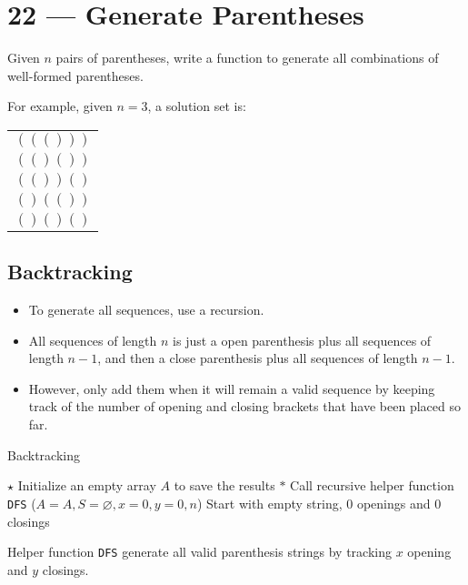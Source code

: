 \section{22 --- Generate Parentheses}
Given $ n $ pairs of parentheses, write a function to generate all combinations of well-formed parentheses.
\par
For example, given $ n = 3 $, a solution set is:
\begin{table}[H]
\begin{tabular}{c}
$ ((())) $\\
  $ (()()) $\\
$   (())() $\\
$   ()(()) $\\
$   ()()() $
\end{tabular}
\end{table}

\subsection{Backtracking}
\begin{itemize}
\item To generate all sequences, use a recursion. 
\item All sequences of length $n$ is just a open parenthesis plus all sequences of length $n-1$, and then a close parenthesis plus all sequences of length $n-1$.
\item However, only add them when it will remain a valid sequence by keeping track of the number of opening and closing brackets that have been placed so far.
\end{itemize}


\setcounter{algorithm}{0}
\begin{algorithm}[H]
\caption{Backtracking}
\begin{algorithmic}[1]
\State $ \star $ Initialize an empty array $A$ to save the results
\State $\ast$ Call recursive helper function \texttt{DFS}
\State {}($A=A, S=\varnothing, x=0, y=0, n$) \Comment Start with empty string, 0 openings and 0 closings
\EndProcedure
\end{algorithmic}
\end{algorithm}

Helper function \texttt{DFS} generate all valid parenthesis strings by tracking $x$ opening and $y$ closings.

